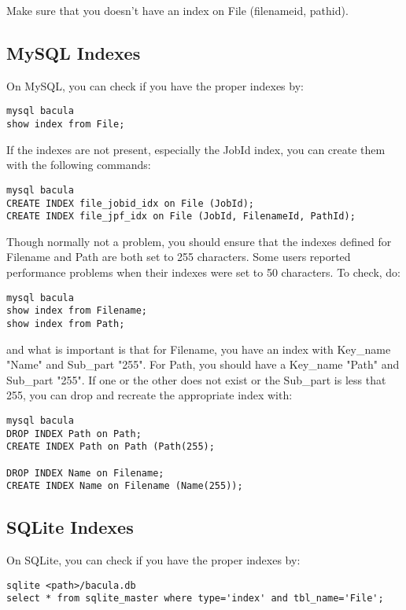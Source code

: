 Make sure that you doesn't have an index on File (filenameid, pathid).

\subsection{MySQL Indexes}
On MySQL, you can check if you have the proper indexes by:

\footnotesize
\begin{verbatim}
mysql bacula
show index from File;
\end{verbatim}
\normalsize

If the indexes are not present, especially the JobId index, you can
create them with the following commands:

\footnotesize
\begin{verbatim}
mysql bacula
CREATE INDEX file_jobid_idx on File (JobId);
CREATE INDEX file_jpf_idx on File (JobId, FilenameId, PathId);
\end{verbatim}
\normalsize

Though normally not a problem, you should ensure that the indexes 
defined for Filename and Path are both set to 255 characters. Some users 
reported performance problems when their indexes were set to 50 characters.
To check, do:

\footnotesize
\begin{verbatim}
mysql bacula
show index from Filename;
show index from Path;
\end{verbatim}
\normalsize

and what is important is that for Filename, you have an index with
Key\_name "Name" and Sub\_part "255". For Path, you should have a Key\_name
"Path" and Sub\_part "255".  If one or the other does not exist or the
Sub\_part is less that 255, you can drop and recreate the appropriate
index with:

\footnotesize
\begin{verbatim}
mysql bacula
DROP INDEX Path on Path;
CREATE INDEX Path on Path (Path(255);

DROP INDEX Name on Filename;
CREATE INDEX Name on Filename (Name(255));
\end{verbatim}
\normalsize


\subsection{SQLite Indexes}
On SQLite, you can check if you have the proper indexes by:

\footnotesize
\begin{verbatim}
sqlite <path>/bacula.db
select * from sqlite_master where type='index' and tbl_name='File';
\end{verbatim}
\normalsize

